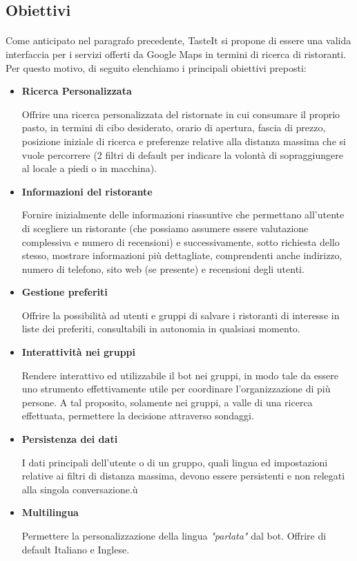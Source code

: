 \documentclass[a4paper, 12pt]{article}
\begin{document}
	\subsection{Obiettivi}
	\paragraph{}
	Come anticipato nel paragrafo precedente, TasteIt si propone di essere una valida interfaccia per i servizi offerti da Google Maps in termini di ricerca di ristoranti. Per questo motivo, di seguito elenchiamo i principali obiettivi preposti:
	\begin{itemize}
		\item \textbf{Ricerca Personalizzata}
		
		Offrire una ricerca personalizzata del ristornate in cui consumare il proprio pasto, in termini di cibo desiderato, orario di apertura, fascia di prezzo, posizione iniziale di ricerca e preferenze relative alla distanza massima che si vuole percorrere (2 filtri di default per indicare la volontà di sopraggiungere al locale a piedi o in macchina).
		
		\item \textbf{Informazioni del ristorante}
		
		Fornire inizialmente delle informazioni riassuntive che permettano all'utente di scegliere un ristorante (che possiamo assumere essere valutazione complessiva e numero di recensioni) e successivamente, sotto richiesta dello stesso, mostrare informazioni più dettagliate, comprendenti anche indirizzo, numero di telefono, sito web (se presente) e recensioni degli utenti.
		
		\item \textbf{Gestione preferiti}
		
		Offrire la possibilità ad utenti e gruppi di salvare i ristoranti di interesse in liste dei preferiti, consultabili in autonomia in qualsiasi momento.
		
		\item \textbf{Interattività nei gruppi}
		
		Rendere interattivo ed utilizzabile il bot nei gruppi, in modo tale da essere uno strumento effettivamente utile per coordinare l'organizzazione di più persone. A tal proposito, solamente nei gruppi, a valle di una ricerca effettuata, permettere la decisione attraverso sondaggi.
		
		\item \textbf{Persistenza dei dati}
		
		I dati principali dell'utente o di un gruppo, quali lingua ed impostazioni relative ai filtri di distanza massima, devono essere persistenti e non relegati alla singola conversazione.ù
		
		\item \textbf{Multilingua}
		
		Permettere la personalizzazione della lingua \textit{"parlata"} dal bot. Offrire di default Italiano e Inglese.
	\end{itemize}
\end{document}
